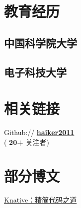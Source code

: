 \documentclass[]{deedy-resume-openfont}
\begin{document}
%
%
\lastupdated

%
%

%
%

\begin{minipage}[t]{0.3\textwidth} 


\section{教育经历} 
\sectionsep

\subsection{中国科学院大学}
\sectionsep

\subsection{电子科技大学}
\sectionsep


\section{相关链接}
\sectionsep    
Github:// \href{https://github.com/haiker2011}{\bf haiker2011} \\
{(\textbf{ 20+ }关注者)} \\

\section{部分博文}
\sectionsep
\href{http://www.servicemesher.com/blog/knative-whittling-down-the-code/}{Knative：精简代码之道} \\



\end{minipage}
\end{document}
